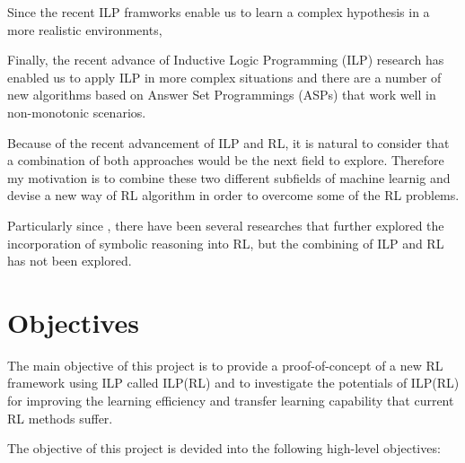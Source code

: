 Since the recent ILP framworks enable us to learn a complex hypothesis in a more realistic environments, 

Finally, the recent advance of Inductive Logic Programming (ILP) research has enabled us to apply ILP in more complex situations and there are a number of new algorithms based on Answer Set Programmings (ASPs) that work well in non-monotonic scenarios.

Because of the recent advancement of ILP and RL, it is natural to consider that a combination of both approaches would be the next field to explore.
Therefore my motivation is to combine these two different subfields of machine learnig and devise a new way of RL algorithm in order to overcome some of the RL problems.

Particularly since \cite{Garnelo2016}, there have been several researches that further explored the incorporation of symbolic reasoning into RL, but the combining of ILP and RL has not been explored. 

\section{Objectives}
\label{sec:objectives}

The main objective of this project is to provide a proof-of-concept of a new RL framework using ILP called ILP(RL) and to investigate the potentials of ILP(RL) for improving the learning efficiency and transfer learning capability that current RL methods suffer.

The objective of this project is devided into the following high-level objectives: 

